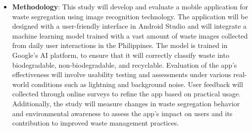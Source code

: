 \begin{itemize}
	\item \textbf{Methodology}: This study will develop and evaluate a mobile application for waste segregation using image recognition technology. The application will be designed with a user-friendly interface in Android Studio and will integrate a machine learning model trained with a vast amount of waste images collected from daily user interactions in the Philippines. The model is trained in Google's AI platform, to ensure that it will correctly classify waste into biodegradable, non-biodegradable, and recyclable. Evaluation of the app's effectiveness will involve usability testing and assessments under various real-world conditions such as lightning and background noise. User feedback will collected through online surveys to refine the app based on practical usage. Additionally, the study will measure changes in waste segregation behavior and environmental awareness to assess the app's impact on users and its contribution to improved waste management practices.
\end{itemize}

